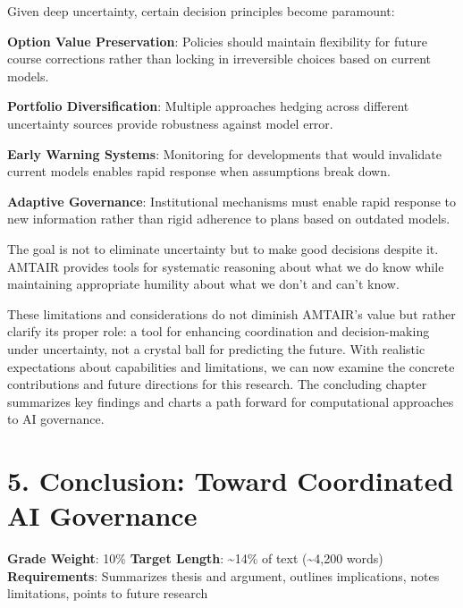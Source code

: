 \documentclass[
  11pt,
  letterpaper,
]{book}
\begin{document}
Given deep uncertainty, certain decision principles become paramount:

\textbf{Option Value Preservation}: Policies should maintain flexibility
for future course corrections rather than locking in irreversible
choices based on current models.

\textbf{Portfolio Diversification}: Multiple approaches hedging across
different uncertainty sources provide robustness against model error.

\textbf{Early Warning Systems}: Monitoring for developments that would
invalidate current models enables rapid response when assumptions break
down.

\textbf{Adaptive Governance}: Institutional mechanisms must enable rapid
response to new information rather than rigid adherence to plans based
on outdated models.

The goal is not to eliminate uncertainty but to make good decisions
despite it. AMTAIR provides tools for systematic reasoning about what we
do know while maintaining appropriate humility about what we don't and
can't know.

These limitations and considerations do not diminish AMTAIR's value but
rather clarify its proper role: a tool for enhancing coordination and
decision-making under uncertainty, not a crystal ball for predicting the
future. With realistic expectations about capabilities and limitations,
we can now examine the concrete contributions and future directions for
this research. The concluding chapter summarizes key findings and charts
a path forward for computational approaches to AI governance.


\chapter*{5. Conclusion: Toward Coordinated AI
Governance}\label{sec-conclusion}


\begin{tcolorbox}[enhanced jigsaw, opacityback=0, leftrule=.75mm, breakable, coltitle=black, colbacktitle=quarto-callout-note-color!10!white, bottomrule=.15mm, rightrule=.15mm, toprule=.15mm, left=2mm, bottomtitle=1mm, arc=.35mm, toptitle=1mm, titlerule=0mm, title=\textcolor{quarto-callout-note-color}{\faInfo}\hspace{0.5em}{Chapter Overview}, opacitybacktitle=0.6, colframe=quarto-callout-note-color-frame, colback=white]

\textbf{Grade Weight}: 10\% \textbar{} \textbf{Target Length}:
\textasciitilde14\% of text (\textasciitilde4,200 words)\\
\textbf{Requirements}: Summarizes thesis and argument, outlines
implications, notes limitations, points to future research

\end{tcolorbox}
\end{document}
